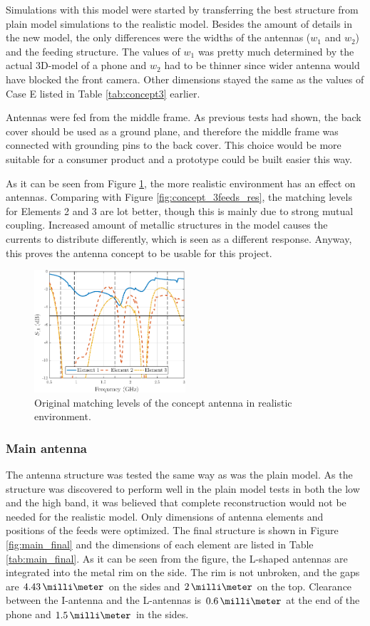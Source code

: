 Simulations with this model were started by transferring the best structure from plain model simulations to the realistic model. Besides the amount of details in the new model, the only differences were the widths of the antennas ($w_1$ and $w_2$) and the feeding structure. The values of $w_1$ was pretty much determined by the actual 3D-model of a phone and $w_2$ had to be thinner since wider antenna would have blocked the front camera. Other dimensions stayed the same as the values of Case E listed in Table \ref{tab:concept3} earlier.

Antennas were fed from the middle frame. As previous tests had shown, the back cover should be used as a ground plane, and therefore the middle frame was connected with grounding pins to the back cover. This choice would be more suitable for a consumer product and a prototype could be built easier this way. 

As it can be seen from Figure \ref{fig:main_orig}, the more realistic environment has an effect on antennas. Comparing with Figure \ref{fig:concept_3feeds_res}, the matching levels for Elements 2 and 3 are lot better, though this is mainly due to strong mutual coupling. Increased amount of metallic structures in the model causes the currents to distribute differently, which is seen as a different response. Anyway, this proves the antenna concept to be usable for this project.
\begin{figure}[H]
    \centering
    \includegraphics[width=0.5\textwidth]{img/main_orig.eps}
    \caption{Original matching levels of the concept antenna in realistic environment.}
    \label{fig:main_orig}
\end{figure}


\subsubsection{Main antenna}
\label{sec:main_antenna}
The antenna structure was tested the same way as was the plain model. As the structure was discovered to perform well in the plain model tests in both the low and the high band, it was believed that complete reconstruction would not be needed for the realistic model. Only dimensions of antenna elements and positions of the feeds were optimized. The final structure is shown in Figure \ref{fig:main_final} and the dimensions of each element are listed in Table \ref{tab:main_final}. As it can be seen from the figure, the L-shaped antennas are integrated into the metal rim on the side. The rim is not unbroken, and the gaps are $4.43\,\milli\meter$ on the sides and $2\,\milli\meter$ on the top. Clearance between the I-antenna and the L-antennas is $0.6\,\milli\meter$ at the end of the phone and $1.5\,\milli\meter$ in the sides.

